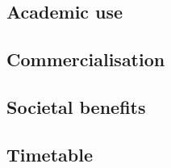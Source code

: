 \subsection{Academic use}

\subsection{Commercialisation}

\subsection{Societal benefits}

\subsection{Timetable}
